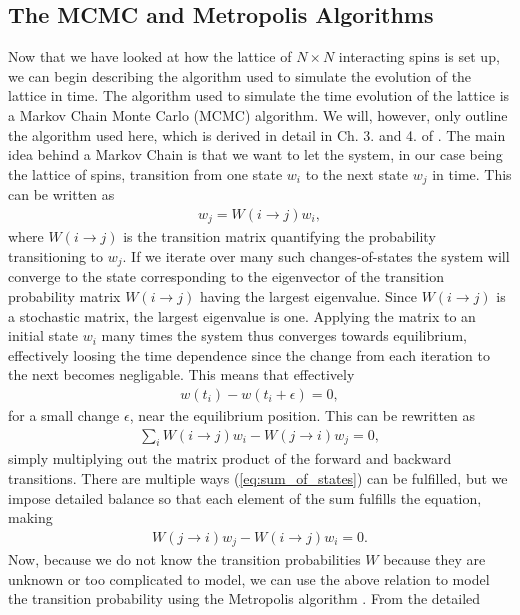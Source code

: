 \documentclass[twocolumn]{aastex62}
\begin{document}
\subsection{The MCMC and Metropolis Algorithms}
Now that we have looked at how the lattice of $N\times N$ interacting spins is set up, we
can begin describing the algorithm used to simulate the evolution of the lattice
in time. The algorithm used to simulate the time evolution of the lattice is a
Markov Chain Monte Carlo (MCMC) algorithm. We will, however, only outline the algorithm
used here, which is derived in detail in Ch. 3. and 4. of \cite{newman:2019}.
The main idea behind a Markov Chain is that we want to let the system, in our
case being the lattice of spins, transition from one state $w_i$ to the next state $w_j$
in time. This can be written as 
\begin{align}
	w_j = W(i\to j)w_i,
\end{align}
where $W(i\to j)$ is the transition matrix quantifying the probability
transitioning to $w_j$. If we iterate over many such changes-of-states
the system will converge to the state corresponding to the eigenvector of the
transition probability matrix $W(i\to j)$ having the largest eigenvalue. Since
$W(i\to j)$ is a stochastic matrix, the largest eigenvalue is one. Applying the
matrix to an initial state $w_i$ many times the system thus converges towards equilibrium, effectively loosing the time dependence since the change from each
iteration to the next becomes negligable. This means that effectively
\begin{align}
	w(t_i) - w(t_i + \epsilon) = 0,
\end{align}
for a small change $\epsilon$, near the equilibrium position. This can be
rewritten as 
\begin{align}
	\sum_i W(i \to j)w_i - W(j \to i)w_j = 0,
	\label{eq:sum_of_states}
\end{align}
simply multiplying out the matrix product of the forward and backward
transitions. There are multiple ways (\ref{eq:sum_of_states}) can be fulfilled,
but we impose detailed balance \citep[Ch. 3. and 4.]{newman:2019} so that each element of the sum
fulfills the equation, making
\begin{align}
	W(j \to i)w_j - W(i \to j)w_i = 0.
\end{align}
Now, because we do not know the transition probabilities $W$ because they are
unknown or too complicated to model, we can use the above relation to model the transition
probability using the Metropolis algorithm \citep[Ch. 3. and 4.]{newman:2019}. From the detailed
\end{document}
